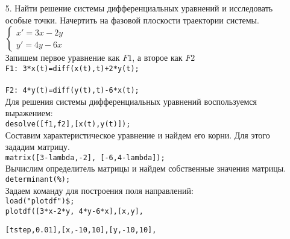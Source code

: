 \documentclass[article, bachelor, och, pract]{SCWorks}
\begin{document}
\begin{itemize}
\item[5.] Найти решение системы дифференциальных уравнений и исследовать особые точки. Начертить на фазовой плоскости траектории системы.\\
\(\left\{
\begin{array}{l}
x'=3x-2y \\
y'=4y-6x
\end{array} \right. \)\\
Запишем первое уравнение как \(F1\), а второе как \(F2\)\\
\texttt{F1: 3*x(t)=diff(x(t),t)+2*y(t);}\\
\\
\texttt{F2: 4*y(t)=diff(y(t),t)-6*x(t);}\\
Для решения системы дифференциальных уравнений воспользуемся выражением:\\
\texttt{desolve([f1,f2],[x(t),y(t)]);}\\
Составим характеристическое уравнение и найдем его корни. Для этого зададим матрицу.\\
\texttt{matrix([3-lambda,-2], [-6,4-lambda]);}\\
Вычислим определитель матрицы и найдем собственные значения матрицы.\\
\texttt{determinant(\%);}\\
Задаем команду для построения поля направлений:\\
\texttt{load("plotdf")\$;}\\
\texttt{plotdf([3*x-2*y, 4*y-6*x],[x,y],}

\texttt{[tstep,0.01],[x,-10,10],[y,-10,10],}


\end{itemize}
\end{document}
